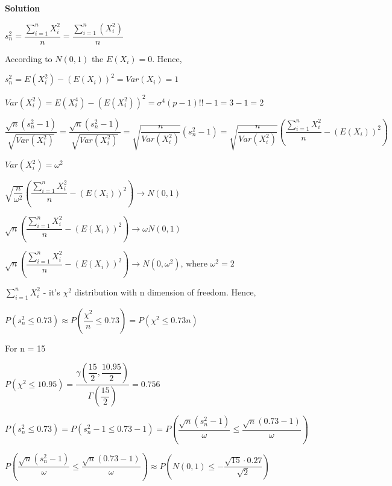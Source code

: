 \documentclass[12pt]{article}
\begin{document}
\textbf{Solution}
\begin{list}{()~}{}
\item $s_n^2 = \dfrac{\sum_{i = 1}^n X_i^2}{n}=\dfrac{\sum_{i = 1}^n\left(X_i^2\right)}{n}$

According to $N\left(0, 1\right)$ the $E\left(X_i\right)=0$. Hence, 

$s_n^2=E\left(X_i^2\right)-\left(E\left(X_i\right)\right)^2 = Var\left(X_i\right) = 1$

\item $Var\left(X_i^2\right) = E\left(X_i^4\right)-\left(E\left(X_i^2\right)\right)^2=\sigma^4\left(p-1\right)!!-1=3-1=2$

$\dfrac{\sqrt{n}\left(s_n^2-1\right)}{\sqrt{Var\left(X_i^2\right)}}=\dfrac{\sqrt{n}\left(s_n^2 - 1\right)}{\sqrt{Var\left(X_i^2\right)}} = \sqrt{\dfrac{n}{Var\left(X_i^2\right)}}\left(s_n^2-1\right) = \sqrt{\dfrac{n}{Var\left(X_i^2\right)}} \left(\dfrac{\sum_{i = 1}^n X_i^2}{n} - \left(E\left(X_i\right)\right)^2\right)$

$Var\left(X_i^2\right) = \omega^2$

$\sqrt{\dfrac{n}{\omega^2}} \left(\dfrac{\sum_{i = 1}^n X_i^2}{n} - \left(E\left(X_i\right)\right)^2\right)\rightarrow N\left(0,1\right)$

$\sqrt{n} \left(\dfrac{\sum_{i = 1}^n X_i^2}{n} - \left(E\left(X_i\right)\right)^2\right)\rightarrow \omega N\left(0,1\right)$

$\sqrt{n} \left(\dfrac{\sum_{i = 1}^n X_i^2}{n} - \left(E\left(X_i\right)\right)^2\right)\rightarrow  N\left(0,\omega^2\right)$, where $\omega^2=2$


\item $\sum_{i = 1}^{n}X_i^2$ - it's $\chi^2$ distribution with n dimension of freedom. Hence, 

$P\left(s_n^2\leq 0.73\right)\approx P\left(\dfrac{\chi^2}{n}\leq 0.73\right)=P\left(\chi^2\leq 0.73n\right)$

For n = 15

$P\left(\chi^2\leq 10.95\right)=\dfrac{\gamma\left(\dfrac{15}{2}, \dfrac{10.95}{2}\right)}{\Gamma\left(\dfrac{15}{2}\right)}=0.756$

\item $P\left(s_n^2\leq 0.73\right) = P\left(s_n^2-1\leq 0.73-1\right) = P\left(\dfrac{\sqrt{n}\left(s_n^2-1\right)}{\omega}\leq \dfrac{\sqrt{n}\left(0.73-1\right)}{\omega}\right)$

$P\left(\dfrac{\sqrt{n}\left(s_n^2-1\right)}{\omega}\leq \dfrac{\sqrt{n}\left(0.73-1\right)}{\omega}\right)\approx P\left(N\left(0, 1\right)\leq -\dfrac{\sqrt{15}\cdot 0.27}{\sqrt{2}}\right)$


\end{list}
\end{document}
